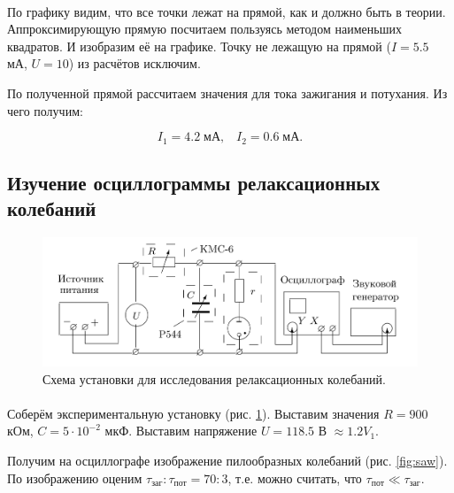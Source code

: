 \documentclass[a4paper,12pt]{article} %
\begin{document}
\paragraph{} По графику видим, что все точки лежат на прямой, как и должно быть в теории. Аппроксимирующую прямую посчитаем пользуясь методом наименьших квадратов. И изобразим её на графике.
Точку не лежащую на прямой ($I = 5.5$ мА, $U = 10$) из расчётов исключим. 


По полученной прямой рассчитаем значения для тока зажигания и потухания. Из чего получим:

\[ I_1 = 4.2 \; \text{мА},\;\;\; I_2 = 0.6 \; \text{мА}.\]

\subsection{Изучение осциллограммы релаксационных колебаний}

\begin{figure}[h]	
\begin{center}
\includegraphics[width=1\textwidth]{scheme3.png}
\caption{Схема установки для исследования релаксационных колебаний.}
\label{fig:sc3}
\end{center}
\end{figure}

\paragraph{} Соберём экспериментальную установку (рис. \ref{fig:sc3}). Выставим значения $R = 900$ кОм, $C = 5 \cdot 10^{-2}$ мкФ. Выставим напряжение $U = 118.5$ В $\approx 1.2 V_1$.

Получим на осциллографе изображение пилообразных колебаний (рис. \ref{fig:saw}). По изображению оценим $\tau_\text{заг}:\tau_\text{пот} = 70:3$, т.е. можно считать, что $\tau_\text{пот} \ll \tau_\text{заг}$.
\end{document}
